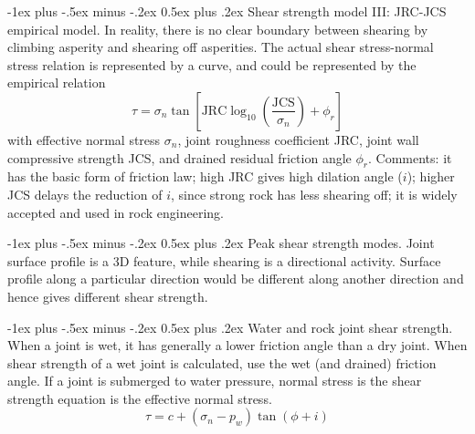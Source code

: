 \documentclass[10pt,landscape,a4paper]{article}
\makeatletter
\renewcommand{\section}{\@startsection{section}{1}{0mm}%
	{-1ex plus -.5ex minus -.2ex}%
	{0.5ex plus .2ex}%
	{\normalfont\large\bfseries}}
\makeatother
\begin{document}
\begin{multicols}{3}
		\section{Shear strength model III: JRC-JCS empirical model.}
		In reality, there is no clear boundary between shearing by climbing asperity and shearing off asperities.
		The actual shear stress-normal stress relation is represented by a curve, and could be represented by the empirical relation
		\[
			\tau=\sigma_n\tan\left[\text{JRC}\log_{10}\left(\frac{\text{JCS}}{\sigma_n}\right)+\phi_r\right]
		\]
		with effective normal stress $\sigma_n$, joint roughness coefficient JRC, joint wall compressive strength JCS, and drained residual friction angle $\phi_r$.
		Comments: it has the basic form of friction law; high JRC gives high dilation angle ($i$); higher JCS delays the reduction of $i$, since strong rock has less shearing off; it is widely accepted and used in rock engineering.
		
		\section{Peak shear strength modes.}
		Joint surface profile is a 3D feature, while shearing is a directional activity.
		Surface profile along a particular direction would be different along another direction and hence gives different shear strength.
		
		\section{Water and rock joint shear strength.}
		When a joint is wet, it has generally a lower friction angle than a dry joint.
		When shear strength of a wet joint is calculated, use the wet (and drained) friction angle.
		If a joint is submerged to water pressure, normal stress is the shear strength equation is the effective normal stress.
		\[
			\tau=c+(\sigma_n-p_w)\tan(\phi+i)
		\]
		

\end{multicols}
\end{document}
